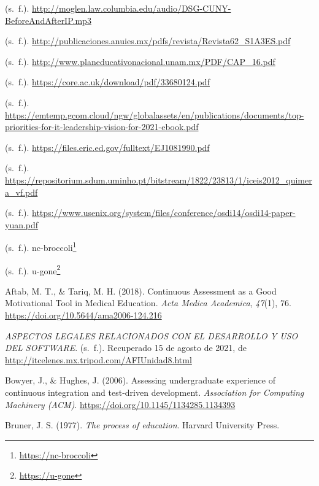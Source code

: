 \documentclass[
  12,
]{scrartcl}
\DeclareRobustCommand{\href}[2]{#2\footnote{\url{#1}}}
\newlength{\cslhangindent}
\newlength{\cslentryspacingunit} %
\newenvironment{CSLReferences}[2] %
 {%
  \setlength{\parindent}{0pt}
  \ifodd #1
  \let\oldpar\par
  \def\par{\hangindent=\cslhangindent\oldpar}
  \fi
  \setlength{\parskip}{#2\cslentryspacingunit}
 }%
 {}
\begin{document}
\hypertarget{refs}{}
\begin{CSLReferences}{1}{0}
\leavevmode\hypertarget{ref-937ioE1w}{}%
(s.~f.).
\url{http://moglen.law.columbia.edu/audio/DSG-CUNY-BeforeAndAfterIP.mp3}

\leavevmode\hypertarget{ref-Z30bKsm}{}%
(s.~f.).
\url{http://publicaciones.anuies.mx/pdfs/revista/Revista62_S1A3ES.pdf}

\leavevmode\hypertarget{ref-AZg3pHkj}{}%
(s.~f.). \url{http://www.planeducativonacional.unam.mx/PDF/CAP_16.pdf}

\leavevmode\hypertarget{ref-k6AZlArO}{}%
(s.~f.). \url{https://core.ac.uk/download/pdf/33680124.pdf}

\leavevmode\hypertarget{ref-r40cJomQ}{}%
(s.~f.).
\url{https://emtemp.gcom.cloud/ngw/globalassets/en/publications/documents/top-priorities-for-it-leadership-vision-for-2021-ebook.pdf}

\leavevmode\hypertarget{ref-EObdM9yf}{}%
(s.~f.). \url{https://files.eric.ed.gov/fulltext/EJ1081990.pdf}

\leavevmode\hypertarget{ref-Rb0wL9fD}{}%
(s.~f.).
\url{https://repositorium.sdum.uminho.pt/bitstream/1822/23813/1/iceis2012_quimera_vf.pdf}

\leavevmode\hypertarget{ref-l4GIpJvw}{}%
(s.~f.).
\url{https://www.usenix.org/system/files/conference/osdi14/osdi14-paper-yuan.pdf}

\leavevmode\hypertarget{ref-w3tk3cB5}{}%
(s.~f.). \href{https://nc-broccoli}{nc-broccoli}

\leavevmode\hypertarget{ref-9rraBh7C}{}%
(s.~f.). \href{https://u-gone}{u-gone}

\leavevmode\hypertarget{ref-EYgw7dv0}{}%
Aftab, M. T., \& Tariq, M. H. (2018). Continuous Assessment as a Good
Motivational Tool in Medical Education. \emph{Acta Medica Academica},
\emph{47}(1), 76. \url{https://doi.org/10.5644/ama2006-124.216}

\leavevmode\hypertarget{ref-w5Mseb7f}{}%
\emph{ASPECTOS LEGALES RELACIONADOS CON EL DESARROLLO Y USO DEL
SOFTWARE}. (s.~f.). Recuperado 15 de agosto de 2021, de
\url{http://itcelenes.mx.tripod.com/AFIUnidad8.html}

\leavevmode\hypertarget{ref-E4qTsP6j}{}%
Bowyer, J., \& Hughes, J. (2006). Assessing undergraduate experience of
continuous integration and test-driven development. \emph{Association
for Computing Machinery (ACM)}.
\url{https://doi.org/10.1145/1134285.1134393}

\leavevmode\hypertarget{ref-isyry8r9}{}%
Bruner, J. S. (1977). \emph{The process of education}. Harvard
University Press.


\end{CSLReferences}
\end{document}
